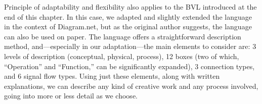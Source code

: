 Principle of adaptability and flexibility also applies to the BVL introduced at the end of this chapter. In this case, we adapted and slightly extended the language in the context of Diagram.net, but as the original author suggests, the language can also be used on paper. The language offers a straightforward description method, and—especially in our adaptation—the main elements to consider are: 3 levels of description (conceptual, physical, process), 12 boxes (two of which, “Operation” and “Function,” can be significantly expanded), 3 connection types, and 6 signal flow types. Using just these elements, along with written explanations, we can describe any kind of creative work and any process involved, going into more or less detail as we choose.
